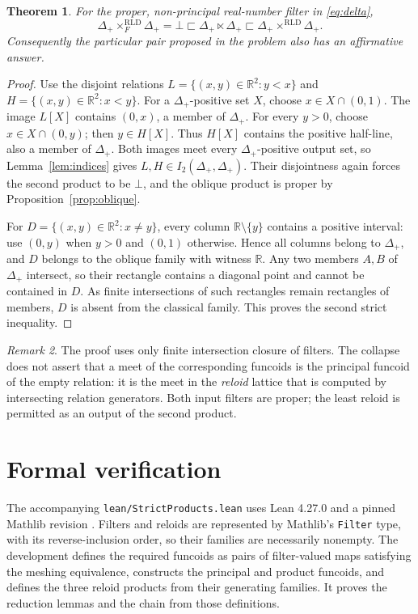 \documentclass[11pt,a4paper]{amsart}
\newtheorem{theorem}{Theorem}[section]
\theoremstyle{definition}
\theoremstyle{remark}
\newtheorem{remark}[theorem]{Remark}
\newcommand{\RLD}{\mathrm{RLD}}
\newcommand{\R}{\mathbb{R}}
\begin{document}
\begin{theorem}\label{thm:real}
For the proper, non-principal real-number filter in \eqref{eq:delta},
\[
 \Delta_+\times_F^{\RLD}\Delta_+=\bot
 \sqsubset\Delta_+\ltimes\Delta_+
 \sqsubset\Delta_+\times^{\RLD}\Delta_+.
\]
Consequently the particular pair proposed in the problem also has an
affirmative answer.
\end{theorem}
\begin{proof}
Use the disjoint relations $L=\{(x,y)\in\R^2:y<x\}$ and
$H=\{(x,y)\in\R^2:x<y\}$. For a $\Delta_+$-positive set $X$, choose
$x\in X\cap(0,1)$. The image $L[X]$ contains $(0,x)$, a member of
$\Delta_+$. For every $y>0$, choose $x\in X\cap(0,y)$; then $y\in H[X]$.
Thus $H[X]$ contains the positive half-line, also a member of $\Delta_+$.
Both images meet every $\Delta_+$-positive output set, so Lemma~\ref{lem:indices}
gives $L,H\in I_2(\Delta_+,\Delta_+)$. Their disjointness again forces the
second product to be $\bot$, and the oblique product is proper by
Proposition~\ref{prop:oblique}.

For $D=\{(x,y)\in\R^2:x\ne y\}$, every column $\R\setminus\{y\}$
contains a positive interval: use $(0,y)$ when $y>0$ and $(0,1)$ otherwise.
Hence all columns belong to $\Delta_+$, and $D$ belongs to the oblique
family with witness $\R$. Any two members $A,B$ of $\Delta_+$ intersect,
so their rectangle contains a diagonal point and cannot be contained in $D$.
As finite intersections of such rectangles remain rectangles of members,
$D$ is absent from the classical family. This proves the second strict
inequality.
\end{proof}

\begin{remark}
The proof uses only finite intersection closure of filters. The collapse does
not assert that a meet of the corresponding funcoids is the principal funcoid
of the empty relation: it is the meet in the \emph{reloid} lattice that is
computed by intersecting relation generators. Both input filters are proper;
the least reloid is permitted as an output of the second product.
\end{remark}

\section{Formal verification}

The accompanying \texttt{lean/StrictProducts.lean} uses Lean 4.27.0 and a pinned
Mathlib revision \cite{mathlib}. Filters and reloids are represented by
Mathlib's \texttt{Filter} type, with its reverse-inclusion order, so their
families are necessarily nonempty. The development defines the required
funcoids as pairs of filter-valued maps satisfying the meshing equivalence,
constructs the principal and product funcoids, and defines the three reloid
products from their generating families. It proves the reduction lemmas and
the chain from those definitions.
\end{document}
